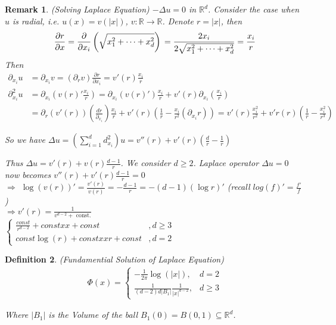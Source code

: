 \documentclass{report}
\theoremstyle{tommy}
\newtheorem{defn}{Definition}
\newtheorem{rem}[defn]{Remark}
\begin{document}
\begin{rem} (Solving Laplace Equation)
  \(-\Delta u = 0\) in \(\mathbb{R}^d\). Consider the case when \(u\) is radial, i.e. \(u(x) = v(|x|)\), \(v: \mathbb{R} \to \mathbb{R}\). Denote \(r = |x|\), then 
  \[
    \frac{\partial r}{\partial x} 
    = \frac{\partial}{\partial x_i}  \left(\sqrt{x_1^2 + \dots + x_d^2}\right) \\
    = \frac{2 x_i}{2{\sqrt{x_1^2 + \dots + x_d^2}}} \\
    = \frac{x_i}{r}
  \]
  Then
  \begin{align*}
    \partial_{x_i} u &= \partial_{x_i} v = (\partial_r v) \frac{\partial r}{\partial {x_i}} 
    = v'(r) \frac{x_i}{r} \\
    \partial^2_{x_i} u 
    &= \partial_{x_i} \left(v(r)' \frac{x_i}{r}\right) 
    = \partial_{x_i}(v(r)') \frac{x_i}{r} + v'(r) \partial_{x_i} \left(\frac{x_i}{r}\right) \\
    &= \partial_r(v'(r))\left(\frac{dr}{\partial_{x_i}}\right) \frac{x_i}{r} + v'(r)\left( \frac{1}{r} - \frac{x_i}{r^2}(\partial_{x_i} r) \right) 
    = v'(r) \frac{x_i^2}{r^2} + v'r(r)\left(\frac{1}{r} - \frac{x_i^2}{r^3}\right)
  \end{align*}

  So we have \(\Delta u = \left( \sum_{i=1}^d d_{x_i}^2 \right) u = v''(r) + v'(r) (\frac{d}{r} - \frac{1}{r})\)

  Thus \(\Delta u = v'(r) + v(r) \frac{d-1}{r}\). We consider \(d \ge 2\). Laplace operator \(\Delta u = 0\) now becomes \(v''(r) + v'(r) \frac{d-1}{r} = 0\) \\
  \(\Rightarrow\) \(\log(v(r))' = \frac{v'(r)}{v(r)} = - \frac{d-1}{r} = -(d-1)(\log r)'\) (recall \(log(f)' = \frac{f'}{f}\)) \\
  \(\Rightarrow v'(r) = \frac{1}{v^{d-2} + \text{ const.}}\) \\
  \(\begin{cases}
    \frac{const}{r^{d-2}} + const xx + const &,d \ge 3 \\
    const \log(r) + const xx r + const &,d = 2
  \end{cases}\)
\end{rem}

\begin{defn} 
  (Fundamential Solution of Laplace Equation)
  \begin{align*}
    \Phi(x) = \begin{cases}
      - \frac{1}{2 \pi} \log(|x|), & d = 2 \\
      \frac{1}{(d-2) d |B_1|} \frac{1}{|x|^{d-2}}, & d \ge 3
    \end{cases}
  \end{align*}
  
  Where \( |B_1| \) is the Volume of the ball \(B_1(0) = B(0, 1) \subseteq \mathbb{R}^d\).

\end{defn}
\end{document}
